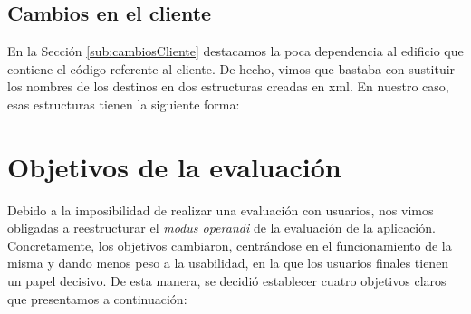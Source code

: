 %
%



\subsection{Cambios en el cliente}
\label{sub:cambiosCliente_vivienda}

En la Sección \ref{sub:cambiosCliente} destacamos la poca dependencia al edificio que contiene el código referente al cliente. De hecho, vimos que bastaba con sustituir los nombres de los destinos en dos estructuras creadas en xml. En nuestro caso, esas estructuras tienen la siguiente forma: 






\section{Objetivos de la evaluación}
\label{sec:objetivosEval}

Debido a la imposibilidad de realizar una evaluación con usuarios, nos vimos obligadas a reestructurar el \textit{modus operandi} de la evaluación de la aplicación. Concretamente, los objetivos cambiaron, centrándose en el funcionamiento de la misma y dando menos peso a la usabilidad, en la que los usuarios finales tienen un papel decisivo. De esta manera, se decidió establecer cuatro objetivos claros que presentamos a continuación:

